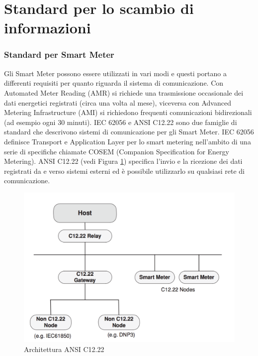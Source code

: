 \section{Standard per lo scambio di informazioni}
\subsubsection{Standard per Smart Meter}
Gli Smart Meter possono essere utilizzati in vari modi e questi portano a differenti requisiti per quanto riguarda il sistema di comunicazione. Con Automated Meter Reading (AMR) si richiede una trasmissione occasionale dei dati energetici registrati (circa una volta al mese), viceversa con  Advanced Metering Infrastructure (AMI) si richiedono frequenti comunicazioni bidirezionali (ad esempio ogni 30 minuti). IEC 62056 e ANSI C12.22 sono due famiglie di standard che descrivono sistemi di comunicazione per gli Smart Meter. IEC 62056 definisce Transport e Application Layer per lo smart metering nell'ambito di una serie di specifiche chiamate COSEM (Companion Specification for Energy Metering). ANSI C12.22 (vedi Figura \ref{fig:arch_c1222}) specifica l'invio e la ricezione dei dati registrati da e verso sistemi esterni ed è possibile utilizzarlo su qualsiasi rete di comunicazione.
\begin{figure}[h]
	\centering
	\includegraphics[scale=0.350]{imgs/arch_c1222.png}
	\caption{Architettura ANSI C12.22} \label{fig:arch_c1222}
\end{figure}
\newpage
